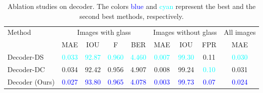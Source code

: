 \begin{table*}[ht]
\renewcommand\arraystretch{1.5}
\setlength\tabcolsep{5pt}
\centering
\caption{Ablation studies on decoder. The colors \textcolor{blue}{blue} and \textcolor{cyan}{cyan} represent the best and the second best methods, respectively.} 
\label{tab:ab_decoder}
\begin{tabular}{lcccccccc} 
\toprule
\multirow{2}{*}{Method} & \multicolumn{4}{c}{Images with glass} & \multicolumn{3}{c}{Images without glass} & All images        \\ 
\cmidrule[0.25pt](lr){2-5} \cmidrule[0.25pt](lr){6-8} \cmidrule[0.25pt](lr){9-9} 
& MAE                       & IOU                         & F                     & BER                       & MAE                       & IOU                    & FPR                      & MAE   \\ 
\midrule

Decoder-DS & \multicolumn{1}{c}{\textcolor{cyan}{0.033}} & \multicolumn{1}{c}{\textcolor{cyan}{92.87}} & \multicolumn{1}{c}{\textcolor{cyan}{0.960}} & \textcolor{cyan}{4.460} & \multicolumn{1}{c}{\textcolor{cyan}{0.007}} & \multicolumn{1}{c}{\textcolor{cyan}{99.30}} & 0.11 & \textcolor{cyan}{0.030}\\ 
Decoder-DC & \multicolumn{1}{c}{0.034} & \multicolumn{1}{c}{92.42} & \multicolumn{1}{c}{0.956} & 4.907 & \multicolumn{1}{c}{0.008} & \multicolumn{1}{c}{99.24} & \textcolor{cyan}{0.10} & 0.031\\ \hline

Decoder (Ours) & \multicolumn{1}{c}{\textcolor{blue}{0.027}} & \multicolumn{1}{c}{\textcolor{blue}{93.80}} & \multicolumn{1}{c}{\textcolor{blue}{0.965}} & \textcolor{blue}{4.078} & \multicolumn{1}{c}{\textcolor{blue}{0.003}} & \multicolumn{1}{c}{\textcolor{blue}{99.73}} & \textcolor{blue}{0.07} &\textcolor{blue}{0.024}\\ 
\bottomrule
\end{tabular}
\end{table*}



